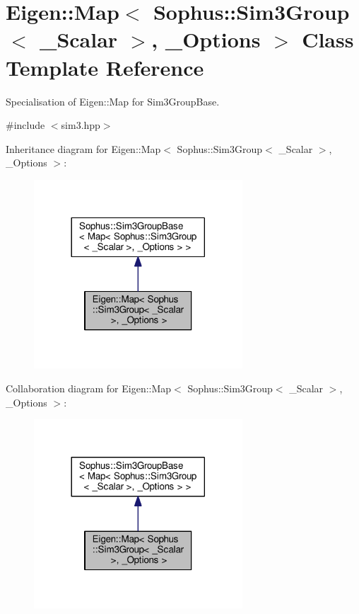 \hypertarget{class_eigen_1_1_map_3_01_sophus_1_1_sim3_group_3_01___scalar_01_4_00_01___options_01_4}{}\section{Eigen\+:\+:Map$<$ Sophus\+:\+:Sim3\+Group$<$ \+\_\+\+Scalar $>$, \+\_\+\+Options $>$ Class Template Reference}
\label{class_eigen_1_1_map_3_01_sophus_1_1_sim3_group_3_01___scalar_01_4_00_01___options_01_4}


Specialisation of Eigen\+::\+Map for Sim3\+Group\+Base.  




{\ttfamily \#include $<$sim3.\+hpp$>$}



Inheritance diagram for Eigen\+:\+:Map$<$ Sophus\+:\+:Sim3\+Group$<$ \+\_\+\+Scalar $>$, \+\_\+\+Options $>$\+:
\nopagebreak
\begin{figure}[H]
\begin{center}
\leavevmode
\includegraphics[width=221pt]{class_eigen_1_1_map_3_01_sophus_1_1_sim3_group_3_01___scalar_01_4_00_01___options_01_4__inherit__graph}
\end{center}
\end{figure}


Collaboration diagram for Eigen\+:\+:Map$<$ Sophus\+:\+:Sim3\+Group$<$ \+\_\+\+Scalar $>$, \+\_\+\+Options $>$\+:
\nopagebreak
\begin{figure}[H]
\begin{center}
\leavevmode
\includegraphics[width=221pt]{class_eigen_1_1_map_3_01_sophus_1_1_sim3_group_3_01___scalar_01_4_00_01___options_01_4__coll__graph}
\end{center}
\end{figure}
